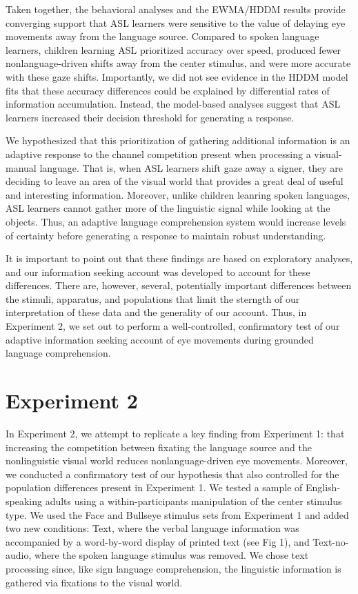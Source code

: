 \documentclass[english,floatsintext,man]{apa6}
\theoremstyle{definition}
\theoremstyle{definition}
\theoremstyle{definition}
\theoremstyle{remark}
\begin{document}
Taken together, the behavioral analyses and the EWMA/HDDM results
provide converging support that ASL learners were sensitive to the value
of delaying eye movements away from the language source. Compared to
spoken language learners, children learning ASL prioritized accuracy
over speed, produced fewer nonlanguage-driven shifts away from the
center stimulus, and were more accurate with these gaze shifts.
Importantly, we did not see evidence in the HDDM model fits that these
accuracy differences could be explained by differential rates of
information accumulation. Instead, the model-based analyses suggest that
ASL learners increased their decision threshold for generating a
response.

We hypothesized that this prioritization of gathering additional
information is an adaptive response to the channel competition present
when processing a visual-manual language. That is, when ASL learners
shift gaze away a signer, they are deciding to leave an area of the
visual world that provides a great deal of useful and interesting
information. Moreover, unlike children leanring spoken languages, ASL
learners cannot gather more of the linguistic signal while looking at
the objects. Thus, an adaptive language comprehension system would
increase levels of certainty before generating a response to maintain
robust understanding.

It is important to point out that these findings are based on
exploratory analyses, and our information seeking account was developed
to account for these differences. There are, however, several,
potentially important differences between the stimuli, apparatus, and
populations that limit the sterngth of our interpretation of these data
and the generality of our account. Thus, in Experiment 2, we set out to
perform a well-controlled, confirmatory test of our adaptive information
seeking account of eye movements during grounded language comprehension.

\hypertarget{experiment-2}{%
\section{Experiment 2}\label{experiment-2}}

In Experiment 2, we attempt to replicate a key finding from Experiment
1: that increasing the competition between fixating the language source
and the nonlinguistic visual world reduces nonlanguage-driven eye
movements. Moreover, we conducted a confirmatory test of our hypothesis
that also controlled for the population differences present in
Experiment 1. We tested a sample of English-speaking adults using a
within-participants manipulation of the center stimulus type. We used
the Face and Bullseye stimulus sets from Experiment 1 and added two new
conditions: Text, where the verbal language information was accompanied
by a word-by-word display of printed text (see Fig 1), and
Text-no-audio, where the spoken language stimulus was removed. We chose
text processing since, like sign language comprehension, the linguistic
information is gathered via fixations to the visual world.
\end{document}
